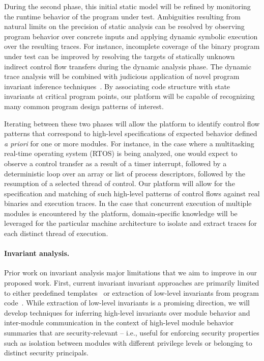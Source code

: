 \documentclass[letterpaper,twoside,11pt,headings=small]{scrartcl}
\begin{document}
During the second phase, this initial static model will be refined by
monitoring the runtime behavior of the program under test.  Ambiguities
resulting from natural limits on the precision of static analysis can be
resolved by observing program behavior over concrete inputs and applying
dynamic symbolic execution over the resulting traces.  For instance,
incomplete coverage of the binary program under test can be improved by
resolving the targets of statically unknown indirect control flow transfers
during the dynamic analysis phase.  The dynamic trace analysis will be
combined with judicious application of novel program invariant inference
techniques~\cite{ernst:2009:daikon,csallner:icse2008:dysy,krka:icsa2010:inference}.
By associating code structure with state invariants at critical program
points, our platform will be capable of recognizing many common program design
patterns of interest.

Iterating between these two phases will allow the platform to identify control
flow patterns that correspond to high-level specifications of expected
behavior defined \emph{a priori} for one or more modules.  For instance, in
the case where a multitasking real-time operating system (RTOS) is being
analyzed, one would expect to observe a control transfer as a result of a
timer interrupt, followed by a deterministic loop over an array or list of
process descriptors, followed by the resumption of a selected thread of
control.  Our platform will allow for the specification and matching of such
high-level patterns of control flows against real binaries and execution
traces.  In the case that concurrent execution of multiple modules is
encountered by the platform, domain-specific knowledge will be leveraged for
the particular machine architecture to isolate and extract traces for each
distinct thread of execution.

\paragraph{Invariant analysis.} Prior work on invariant analysis major
limitations that we aim to improve in our proposed work.  First, current
invariant invariant approaches are primarily limited to either predefined
templates~\cite{ernst:2009:daikon} or extraction of low-level invariants from
program code~\cite{csallner:icse2008:dysy}.  While extraction of low-level
invariants is a promising direction, we will develop techniques for inferring
high-level invariants over module behavior and inter-module communication in
the context of high-level module behavior summaries that are security-relevant
-- i.e., useful for enforcing security properties such as isolation between
   modules with different privilege levels or belonging to distinct security
   principals.
\end{document}
